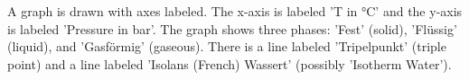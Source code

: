 A graph is drawn with axes labeled. The x-axis is labeled 'T in °C' and the y-axis is labeled 'Pressure in bar'. The graph shows three phases: 'Fest' (solid), 'Flüssig' (liquid), and 'Gasförmig' (gaseous). There is a line labeled 'Tripelpunkt' (triple point) and a line labeled 'Isolans (French) Wassert' (possibly 'Isotherm Water').